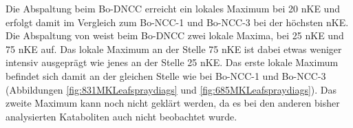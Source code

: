 Die  Abspaltung beim Bo-DNCC erreicht ein lokales Maximum bei 20 \gls{nKE} und erfolgt damit im Vergleich zum Bo-NCC-1 und Bo-NCC-3 bei der höchsten \gls{nKE}. Die Abspaltung von  weist beim Bo-DNCC zwei lokale Maxima, bei 25 \gls{nKE} und 75 \gls{nKE} auf. Das lokale Maximum an der Stelle 75 \gls{nKE} ist dabei etwas weniger intensiv ausgeprägt wie jenes an der Stelle 25 \gls{nKE}. Das erste lokale Maximum befindet sich damit an der gleichen Stelle wie bei Bo-NCC-1 und Bo-NCC-3 (Abbildungen \ref{fig:831MKLeafspraydiags} und \ref{fig:685MKLeafspraydiags}). Das zweite Maximum kann noch nicht geklärt werden, da es bei den anderen bisher analysierten Kataboliten auch nicht beobachtet wurde.

